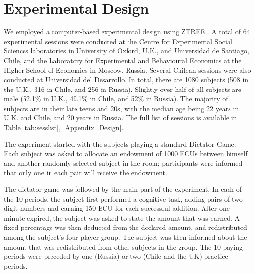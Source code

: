 \documentclass[12pt]{article}
\begin{document}
\section*{Experimental Design}

\par We employed a computer-based experimental design using ZTREE \citep{Fischbacher2007}. A total of 64 experimental sessions were conducted at the Centre for Experimental Social Sciences laboratories in University of Oxford, U.K., and Universidad de Santiago, Chile, and the Laboratory for Experimental and Behavioural Economics at the Higher School of Economics in Moscow, Russia. Several  Chilean sessions were also conducted at Universidad del Desarrollo. In total, there are 1080 subjects (508 in the U.K., 316 in Chile, and 256 in Russia). Slightly over half of all subjects are male (52.1\% in U.K., 49.1\% in Chile, and 52\% in Russia). The majority of subjects are in their late teens and 20s, with the median age being 22 years in U.K. and Chile, and 20 years in Russia. The full list of sessions is available in Table \ref{tab:sesslist}, \ref{Appendix_Design}.

\par The experiment started with the subjects playing a standard Dictator Game. Each subject was asked to allocate an endowment of 1000 ECUs between himself and another randomly selected subject in the room; participants were informed that only one in each pair will receive the endowment. 

\par The dictator game was followed by the main part of the experiment. In each of the 10 periods, the subject first performed a cognitive task, adding pairs of two-digit numbers and earning 150 ECU for each successful addition. After one minute expired, the subject was asked to state the amount that was earned. 
A fixed percentage was then deducted from the declared amount, and redistributed among the subject’s four-player group. The subject was then informed about the amount that was redistributed from other subjects in the group.\footnotemark{}
The 10 paying periods were preceded by one (Russia) or two (Chile and the UK) practice periods.
\end{document}

